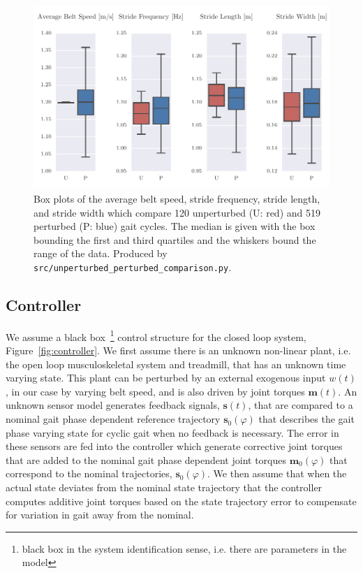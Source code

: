 \documentclass{article}
\begin{document}
\begin{figure}
  \centering
  \includegraphics{figures/unperturbed-perturbed-boxplot-comparison.pdf}
  \cprotect\caption{Box plots of the average belt speed, stride frequency,
    stride length, and stride width which compare 120 unperturbed (U: red) and
    519 perturbed (P: blue) gait cycles. The median is given with the box
    bounding the first and third quartiles and the whiskers bound the range of
    the data. Produced by \verb|src/unperturbed_perturbed_comparison.py|.}
  \label{fig:gait-cycle-stats-comparison}
\end{figure}

\subsection*{Controller}
\label{sec:controller}
%
We assume a black box~\footnote{black box in the system identification sense,
i.e. there are parameters in the model} control structure for the closed loop
system, Figure~\ref{fig:controller}. We first assume there is an unknown
non-linear plant, i.e. the open loop musculoskeletal system and treadmill, that
has an unknown time varying state. This plant can be perturbed by an external
exogenous input $w(t)$, in our case by varying belt speed, and is also driven
by joint torques $\mathbf{m}(t)$. An unknown sensor model generates feedback
signals, $\mathbf{s}(t)$, that are compared to a nominal gait phase dependent
reference trajectory $\mathbf{s}_0(\varphi)$ that describes the gait phase
varying state for cyclic gait when no feedback is necessary. The error in these
sensors are fed into the controller which generate corrective joint torques
that are added to the nominal gait phase dependent joint torques
$\mathbf{m}_0(\varphi)$ that correspond to the nominal trajectories,
$\mathbf{s}_0(\varphi)$. We then assume that when the actual state deviates
from the nominal state trajectory that the controller computes additive joint
torques based on the state trajectory error to compensate for variation in gait
away from the nominal.
\end{document}
